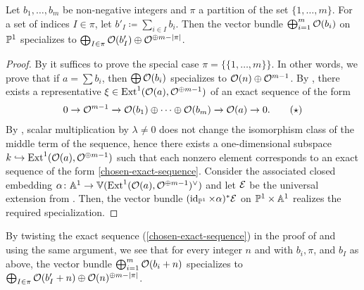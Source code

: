 \begin{proposition} \label{specialization-partitions}
	Let $b_1,\dotsc,b_m$ be non-negative integers and $\pi$ a partition of the set $\{1,\dotsc,m\}$. For a set of indices $I\in \pi$, let $b'_I \coloneqq \sum_{i \in I} b_i$. Then the vector bundle $\bigoplus_{i=1}^m \mathcal{O} (b_i)$ on $\mathbb{P}^1$ specializes to $\bigoplus_{I\in\pi} \mathcal{O}(b'_I) \oplus \mathcal{O}^{\oplus m-\lvert\pi\rvert}$.	
\end{proposition}

\begin{proof}
	By  it suffices to prove the special case $\pi = \{\{1,\dotsc,m\}\}$. In other words, we prove that if $a = \sum b_i$, then $\bigoplus\mathcal{O}(b_i)$ specializes to $\mathcal{O}(n)\oplus \mathcal{O}^{m-1}$. By , there exists a representative $\xi \in \operatorname{Ext}^1(\mathcal{O}(a),\mathcal{O}^{\oplus m-1})$ of an exact sequence of the form
	\begin{align} \label{chosen-exact-sequence}
		0 \to \mathcal{O}^{m-1} \xrightarrow{} \mathcal{O}(b_1)\oplus \dotsb \oplus \mathcal{O}(b_m) \xrightarrow{} \mathcal{O}(a) \to 0. \tag{$\star$}
	\end{align}
	By , scalar multiplication by $\lambda \neq 0$ does not change the isomorphism class of the middle term of the sequence, hence there exists a one-dimensional subspace $k \injectto \Ext^1(\mc{O}(a),\mc{O}^{\oplus m-1})$ such that each nonzero element corresponds to an exact sequence of the form
	\ref{chosen-exact-sequence}. Consider the associated closed embedding $\alpha \colon \mathbb{A}^1 \to \mathbb{V}(\operatorname{Ext}^1(\mathcal{O}(a),\mathcal{O}^{\oplus m-1})^\vee)$ and let $\mathcal{E}$ be the universal extension from . Then, the vector bundle $(\operatorname{id}_{\mathbb{P}^1}\times\alpha)^{*}\mathcal{E}$ on $\mathbb{P}^1\times\mathbb{A}^1$ realizes the required specialization. 
\end{proof}

\begin{remark}
	By twisting the exact sequence (\ref{chosen-exact-sequence}) in the proof of  and using the same argument, we see that for every integer $n$ and with $b_i, \pi$, and $b_I$ as above, the vector bundle $\bigoplus_{i=1}^m \mathcal{O} (b_i+n)$ specializes to $\bigoplus_{I\in\pi} \mathcal{O}(b'_I+n) \oplus \mathcal{O}(n)^{\oplus m-\lvert\pi\rvert}$.
\end{remark}